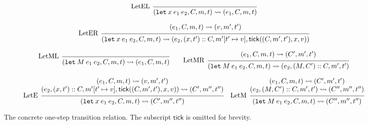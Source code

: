 \documentclass[acmsmall,review]{acmart}\settopmatter{printfolios=true,printccs=false,printacmref=false}
\theoremstyle{definition}
\newcommand*{\cons}{::}
\newcommand*{\mem}{m}
\newcommand*{\semarrow}{\rightsquigarrow}
\newcommand*{\tick}{\mathsf{tick}}
\begin{document}
\begin{figure}[h!]
  \[
    \begin{prooftree}
      \infer[left label=LetEL]0{
      (\mathtt{let}\:x\:e_1\:e_2, C, \mem, t)
      \semarrow
      (e_{1}, C, \mem, t)
      }
    \end{prooftree}
  \]

  \[
    \begin{prooftree}
      \hypo{
        \begin{matrix}
          (e_{1}, C, \mem, t)
          \semarrow
          (v, \mem', t')
        \end{matrix}
      }
      \infer[left label=LetER]1{
      (\mathtt{let}\:x\:e_1\:e_2, C, \mem, t)
      \semarrow
      (e_{2}, (x, t')\cons C, \mem'[t'\mapsto v], \tick((C,\mem',t'),x,v))
      }
    \end{prooftree}
  \]

  \[
    \begin{prooftree}
      \infer[left label=LetML]0{
      (\mathtt{let}\:M\:e_{1}\:e_{2}, C, \mem, t)
      \semarrow
      (e_{1}, C, \mem, t)
      }
    \end{prooftree}\qquad
    \begin{prooftree}
      \hypo{
        \begin{matrix}
          (e_{1}, C, \mem, t)
          \semarrow
          (C', \mem', t')
        \end{matrix}
      }
      \infer[left label=LetMR]1{
      (\mathtt{let}\:M\:e_{1}\:e_{2}, C, \mem, t)
      \semarrow
      (e_{2}, (M, C')\cons C, \mem', t')
      }
    \end{prooftree}
  \]

  \[
    \begin{prooftree}
      \hypo{
        \begin{matrix}
          (e_{1}, C, \mem, t)
          \semarrow
          (v, \mem', t') \\
          (e_{2}, (x, t')\cons C, \mem'[t'\mapsto v], \tick((C,\mem',t'),x,v))
          \semarrow
          (C', \mem'', t'')
        \end{matrix}
      }
      \infer[left label=LetE]1{
      (\mathtt{let}\:x\:e_1\:e_2, C, \mem, t)
      \semarrow
      (C', \mem'', t'')
      }
    \end{prooftree}\quad
    \begin{prooftree}
      \hypo{
        \begin{matrix}
          (e_{1}, C, \mem, t)
          \semarrow
          (C', \mem', t') \\
          (e_{2}, (M, C')\cons C, \mem', t')
          \semarrow
          (C'', \mem'', t'')
        \end{matrix}
      }
      \infer[left label=LetM]1{
      (\mathtt{let}\:M\:e_{1}\:e_{2}, C, \mem, t)
      \semarrow
      (C'', \mem'', t'')
      }
    \end{prooftree}
  \]
  \caption{The concrete one-step transition relation. The subscript $\tick$ is omitted for brevity.}
  \label{fig:concreach}
\end{figure}
\end{document}

